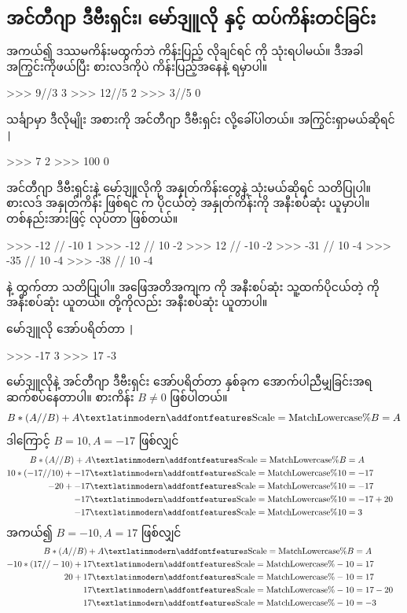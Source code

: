 \subsection*{အင်တီဂျာ ဒီဗီးရှင်း၊ မော်ဒျူလို နှင့် ထပ်ကိန်းတင်ခြင်း}
အကယ်၍ ဒဿမကိန်းမထွက်ဘဲ ကိန်းပြည့် လိုချင်ရင် \fCode{//} ကို သုံးရပါမယ်။ ဒီအခါ အကြွင်းကိုဖယ်ပြီး စားလဒ်ကိုပဲ ကိန်းပြည့်အနေနဲ့ ရမှာပါ။ 
%
\setlength{\fboxsep}{0pt}
\begin{codetxt}
>>> 9//3
3
>>> 12//5
2
>>> 3//5
0
\end{codetxt}
%
သင်္ချာမှာ ဒီလိုမျိုး အစားကို အင်တီဂျာ ဒီဗီးရှင်း  လို့ခေါ်ပါတယ်။ အကြွင်းရှာမယ်ဆိုရင် \texttt|%
%
\setlength{\fboxsep}{0pt}
\begin{codetxt}
>>> 7 %
2
>>> 100 %
0
\end{codetxt}
%

အင်တီဂျာ ဒီဗီးရှင်းနဲ့ မော်ဒျူလိုကို အနှုတ်ကိန်းတွေနဲ့ သုံးမယ်ဆိုရင် သတိပြုပါ။  စားလဒ် အနှုတ်ကိန်း ဖြစ်ရင် \fCode{//} က ပိုငယ်တဲ့ အနှုတ်ကိန်းကို အနီးစပ်ဆုံး ယူမှာပါ။ တစ်နည်းအားဖြင့်  လုပ်တာ ဖြစ်တယ်။
%
\setlength{\fboxsep}{0pt}
\begin{codetxt}
>>> -12 // -10
1
>>> -12 // 10
-2
>>> 12 // -10
-2
>>> -31 // 10
-4
>>> -35 // 10
-4
>>> -38 // 10
-4
\end{codetxt}
%
 နဲ့  ထွက်တာ သတိပြုပါ။ အဖြေအတိအကျက  ကို အနီးစပ်ဆုံး သူ့ထက်ပိုငယ်တဲ့  ကို အနီးစပ်ဆုံး ယူတယ်။ \fEn{,} \fEn{,}  တို့ကိုလည်း အနီးစပ်ဆုံး  ယူတာပါ။

မော်ဒျူလို အော်ပရိတ်တာ \texttt|%
%
\setlength{\fboxsep}{0pt}
\begin{codetxt}
>>> -17 %
3
>>> 17 %
-3
\end{codetxt}
%
မော်ဒျူလိုနဲ့ အင်တီဂျာ ဒီဗီးရှင်း အော်ပရိတ်တာ နှစ်ခုက အောက်ပါညီမျှခြင်းအရ ဆက်စပ်နေတာပါ။ စားကိန်း $B \neq 0$ ဖြစ်ပါတယ်။
\[
  B * (A // B) + A \SI{}{\fEn{\percent}} B = A
\]
ဒါကြောင့် $B = 10, A = -17$ ဖြစ်လျှင် 
\begin{align*}
B * (A//B) + A \SI{}{\fEn{\percent}} B &= A &\\
10 * (-17//10) + -17 \SI{}{\fEn{\percent}} 10 &= -17 &\\
-20 + -17 \SI{}{\fEn{\percent}} 10 &= -17 &\\
-17 \SI{}{\fEn{\percent}} 10 &= -17 + 20 &\\
-17 \SI{}{\fEn{\percent}} 10 &= 3 &
\end{align*}
အကယ်၍ $B = -10, A = 17$ ဖြစ်လျှင်
\begin{align*}
B * (A//B) + A \SI{}{\fEn{\percent}} B &= A&\\
-10 * (17//-10) + 17 \SI{}{\fEn{\percent}} -10 &= 17&\\
20 + 17 \SI{}{\fEn{\percent}} -10 &= 17&\\
17 \SI{}{\fEn{\percent}} -10 &= 17 - 20&\\
17 \SI{}{\fEn{\percent}} -10 &= -3 &
\end{align*}

